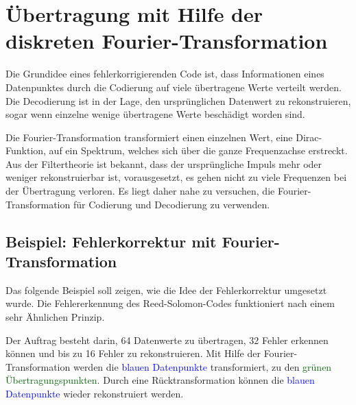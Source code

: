 %
%
\section{Übertragung mit Hilfe der diskreten Fourier-Transformation
\label{reedsolomon:section:dtf}}
Die Grundidee eines fehlerkorrigierenden Code ist, dass Informationen eines Datenpunktes
durch die Codierung auf viele übertragene Werte verteilt werden.
Die Decodierung ist in der Lage, den ursprünglichen Datenwert zu rekonstruieren,
sogar wenn einzelne wenige übertragene Werte beschädigt worden sind.
\par
Die Fourier-Transformation transformiert einen einzelnen Wert, 
%
eine Dirac-Funktion, auf ein Spektrum, welches sich über die ganze Frequenzachse erstreckt.
%
%
Aus der Filtertheorie ist bekannt, dass der ursprüngliche Impuls mehr oder weniger rekonstruierbar ist,
	vorausgesetzt, es gehen nicht zu viele Frequenzen bei der Übertragung verloren.
%
Es liegt daher nahe zu versuchen, die Fourier-Transformation 
für Codierung und Decodierung zu verwenden.

\subsection{Beispiel: Fehlerkorrektur mit Fourier-Transformation
\label{reedsolomon:subsection:sendbsp}}
Das folgende Beispiel soll zeigen, wie die Idee der Fehlerkorrektur umgesetzt wurde. 
Die Fehlererkennung des Reed-Solomon-Codes funktioniert nach einem sehr Ähnlichen Prinzip.
%

\par
Der Auftrag besteht darin, 64 Datenwerte zu übertragen, 32 Fehler erkennen können und bis zu 16 Fehler zu rekonstruieren.
Mit Hilfe der Fourier-Transformation werden die \textcolor{blue}{blauen Datenpunkte} transformiert,
zu den \textcolor{darkgreen}{grünen Übertragungspunkten}. 
Durch eine Rücktransformation können die \textcolor{blue}{blauen Datenpunkte} wieder rekonstruiert werden.

